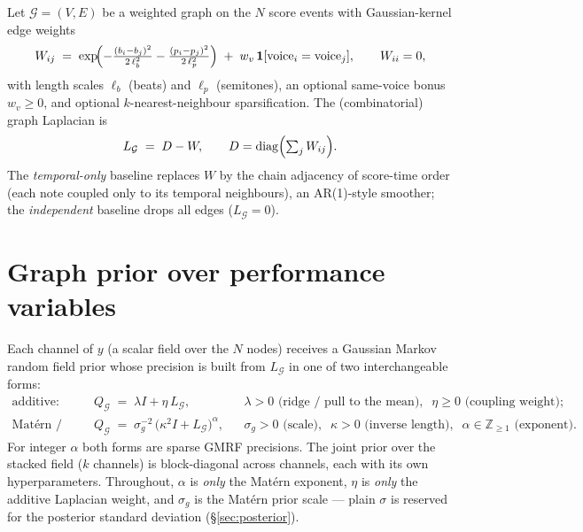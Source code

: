 \documentclass[11pt]{article}
\newcommand{\graph}{\mathcal{G}}
\newcommand{\Qg}{Q_{\graph}}
\newcommand{\Lg}{L_{\graph}}
\newcommand{\diag}{\operatorname{diag}}
\begin{document}
Let $\graph = (V, E)$ be a weighted graph on the $N$ score events with Gaussian-kernel
edge weights
\begin{equation}
  W_{ij} \;=\; \exp\!\Bigl( -\tfrac{(b_i - b_j)^2}{2\,\ell_b^2} - \tfrac{(p_i - p_j)^2}{2\,\ell_p^2} \Bigr)
  \;+\; w_v\, \mathbf{1}[\text{voice}_i = \text{voice}_j],
  \qquad W_{ii} = 0,
  \label{eq:adjacency}
\end{equation}
with length scales $\ell_b$ (beats) and $\ell_p$ (semitones), an optional same-voice bonus
$w_v \ge 0$, and optional $k$-nearest-neighbour sparsification. The (combinatorial) graph
Laplacian is
\begin{equation}
  \Lg \;=\; D - W, \qquad D = \diag\Bigl(\textstyle\sum_j W_{ij}\Bigr).
  \label{eq:laplacian}
\end{equation}
The \emph{temporal-only} baseline replaces $W$ by the chain adjacency of score-time order
(each note coupled only to its temporal neighbours), an AR(1)-style smoother; the
\emph{independent} baseline drops all edges ($\Lg = 0$).

\section{Graph prior over performance variables}

Each channel of $y$ (a scalar field over the $N$ nodes) receives a Gaussian Markov random
field prior whose precision is built from $\Lg$ in one of two interchangeable forms:
\begin{align}
  \text{additive:} \qquad & \Qg \;=\; \lambda I + \eta\, \Lg,
      && \lambda > 0 \text{ (ridge / pull to the mean)}, \;\; \eta \ge 0 \text{ (coupling weight)};
  \label{eq:additive}\\[2pt]
  \text{Mat\'ern / SPDE:} \qquad & \Qg \;=\; \sigma_g^{-2}\,\bigl(\kappa^2 I + \Lg\bigr)^{\alpha},
      && \sigma_g > 0 \text{ (scale)}, \;\; \kappa > 0 \text{ (inverse length)}, \;\; \alpha \in \mathbb{Z}_{\ge 1} \text{ (exponent)}.
  \label{eq:matern}
\end{align}
For integer $\alpha$ both forms are sparse GMRF precisions. The joint prior over the
stacked field ($k$ channels) is block-diagonal across channels, each with its own
hyperparameters. Throughout, $\alpha$ is \emph{only} the Mat\'ern exponent, $\eta$ is
\emph{only} the additive Laplacian weight, and $\sigma_g$ is the Mat\'ern prior scale ---
plain $\sigma$ is reserved for the posterior standard deviation
(\S\ref{sec:posterior}).
\end{document}
